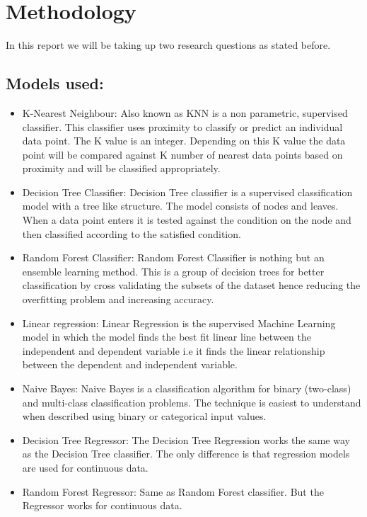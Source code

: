 \documentclass{article}
\begin{document}
\section{Methodology}



In this report we will be taking up two research questions as stated before. 

\subsection{Models used:}
\begin{itemize}
    \item K-Nearest Neighbour: Also known as KNN is a non parametric, supervised classifier. This classifier uses proximity to classify or predict an individual data point. The K value is an integer. Depending on this K value the data point will be compared against K number of nearest data points based on proximity and will be classified appropriately. 
    
    \item Decision Tree Classifier: Decision Tree classifier is a supervised classification model with a tree like structure. The model consists of nodes and leaves. When a data point enters it is tested against the condition on the node and then classified according to the satisfied condition.
    
    \item Random Forest Classifier: Random Forest Classifier is nothing but an ensemble learning method. This is a group of decision trees for better classification by cross validating the subsets of the dataset hence reducing the overfitting problem and increasing accuracy.
    
    \item Linear regression: Linear Regression is the supervised Machine Learning model in which the model finds the best fit linear line between the independent and dependent variable i.e it finds the linear relationship between the dependent and independent variable.
    
    \item Naive Bayes: Naive Bayes is a classification algorithm for binary (two-class) and multi-class classification problems. The technique is easiest to understand when described using binary or categorical input values.
    
    \item Decision Tree Regressor: The Decision Tree Regression works the same way as the Decision Tree classifier. The only difference is that regression models are used for continuous data.
    
    \item Random Forest Regressor: Same as Random Forest classifier. But the Regressor works for continuous data. 
\end{itemize}
\end{document}
